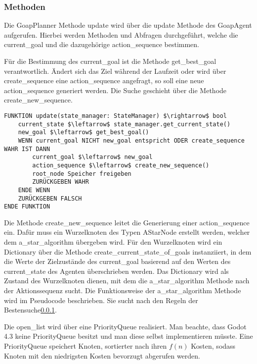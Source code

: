 \subsubsection{Methoden}

Die GoapPlanner Methode update wird über die update Methode des GoapAgent aufgerufen. Hierbei werden Methoden und Abfragen durchgeführt, welche die current\_goal und die dazugehörige action\_sequence bestimmen. 

Für die Bestimmung des current\_goal ist die Methode get\_best\_goal verantwortlich. Ändert sich das Ziel während der Laufzeit oder wird über create\_sequence eine action\_sequence angefragt, so soll eine neue action\_sequence generiert werden. Die Suche geschieht über die Methode create\_new\_sequence. 

\begin{lstlisting}[language=Pseudo, caption={update Methode des GoapAgent}, mathescape=true]
FUNKTION update(state_manager: StateManager) $\rightarrow$ bool
    current_state $\leftarrow$ state_manager.get_current_state()
    new_goal $\leftarrow$ get_best_goal()
    WENN current_goal NICHT new_goal entspricht ODER create_sequence WAHR IST DANN
        current_goal $\leftarrow$ new_goal
        action_sequence $\leftarrow$ create_new_sequence()
        root_node Speicher freigeben
        ZURÜCKGEBEN WAHR
    ENDE WENN
    ZURÜCKGEBEN FALSCH
ENDE FUNKTION
\end{lstlisting}

Die Methode create\_new\_sequence leitet die Generierung einer action\_sequence ein. Dafür muss ein Wurzelknoten des Typen AStarNode erstellt werden, welcher dem a\_star\_algorithm übergeben wird. Für den Wurzelknoten wird ein Dictionary über die Methode create\_current\_state\_of\_goals instanziiert, in dem die Werte der Zielzustände des current\_goal basierend auf den Werten des current\_state des Agenten überschrieben werden. Das Dictionary wird als Zustand des Wurzelknoten dienen, mit dem die a\_star\_algorithm Methode nach der Aktionssequenz sucht. Die Funktionsweise der a\_star\_algorithm Methode wird im Pseudocode beschrieben. Sie sucht nach den Regeln der Bestensuche\ref{}.

Die open\_list wird über eine PriorityQueue realisiert. Man beachte, dass Godot 4.3 keine PriorityQueue besitzt und man diese selbst implementieren müsste. Eine PriorityQueue speichert Knoten, sortierter nach ihren $f(n)$ Kosten, sodass Knoten mit den niedrigsten Kosten bevorzugt abgerufen werden. 


